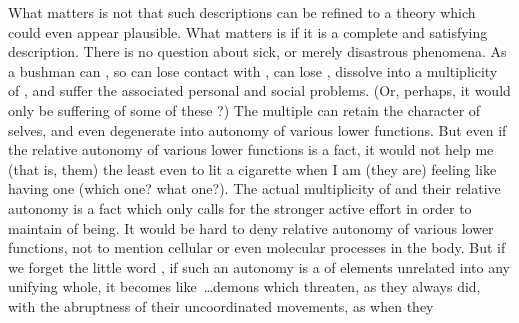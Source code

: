 What matters is not that such descriptions can be refined to a theory which
could even appear plausible. What matters is if it is a complete and satisfying
description.  There is no question about sick, or merely disastrous phenomena.
As a bushman can , so  can lose contact with ,  can lose , dissolve into a multiplicity of ,
and suffer the associated personal and social problems. (Or, perhaps, it would
only be suffering of some of these ?)  The multiple  can
retain the character of selves, and even degenerate into autonomy of various
lower functions.  But even if  the relative autonomy of various
lower functions is a fact, it would not help me (that is, them) the least even
to lit a cigarette when I am (they are) feeling like having one (which one? what
one?).  The actual multiplicity of  and their relative autonomy is a
fact which only calls for the stronger active effort in order to maintain
 of being.  It would be hard to deny relative autonomy of
various lower functions, not to mention cellular or even molecular processes in
the body.  But if we forget the little word , if such an autonomy
is a  of elements unrelated into any unifying whole, it becomes
like~\ldots demons which threaten, as they always did, with the abruptness of
their uncoordinated movements, as when they 

\newp

